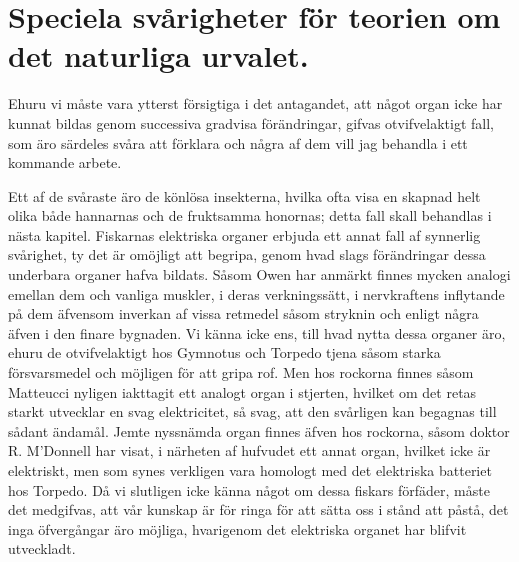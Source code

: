 \section[Speciella svårigheter]{Speciela svårigheter för teorien om det naturliga
urvalet.}

Ehuru vi måste vara ytterst försigtiga i det antagandet, att något organ icke har kunnat bildas genom successiva gradvisa förändringar, gifvas otvifvelaktigt fall, som äro särdeles svåra att förklara och några af dem vill jag behandla i ett kommande arbete.

Ett af de svåraste äro de könlösa insekterna, hvilka ofta visa en skapnad helt olika både hannarnas och de fruktsamma honornas; detta fall skall behandlas i nästa kapitel. Fiskarnas elektriska organer erbjuda ett annat fall af synnerlig svårighet, ty det är omöjligt att begripa, genom hvad slags förändringar dessa underbara organer hafva bildats. Såsom Owen har anmärkt finnes mycken analogi emellan dem och vanliga muskler, i deras verkningssätt, i nervkraftens inflytande på dem äfvensom inverkan af vissa retmedel såsom stryknin och enligt några äfven i den finare bygnaden. Vi känna icke ens, till hvad nytta dessa organer äro, ehuru de otvifvelaktigt hos Gymnotus och Torpedo tjena såsom starka försvarsmedel och möjligen för att gripa rof. Men hos rockorna finnes såsom Matteucci nyligen iakttagit ett analogt organ i stjerten, hvilket om det retas starkt utvecklar en svag elektricitet, så svag, att den svårligen kan begagnas till sådant ändamål. Jemte nyssnämda organ finnes äfven hos rockorna, såsom doktor R. M’Donnell har visat, i närheten af hufvudet ett annat organ, hvilket icke är elektriskt, men som synes verkligen vara homologt med det elektriska batteriet hos Torpedo. Då vi slutligen icke känna något om dessa fiskars förfäder, måste det medgifvas, att vår kunskap är för ringa för att sätta oss i stånd att påstå, det inga öfvergångar äro möjliga, hvarigenom det elektriska organet har blifvit utveckladt.

